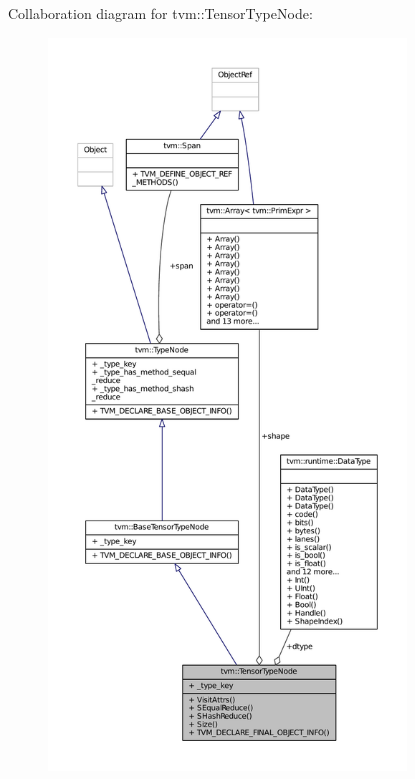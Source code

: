 Collaboration diagram for tvm\+:\+:Tensor\+Type\+Node\+:
\nopagebreak
\begin{figure}[H]
\begin{center}
\leavevmode
\includegraphics[height=550pt]{classtvm_1_1TensorTypeNode__coll__graph}
\end{center}
\end{figure}
